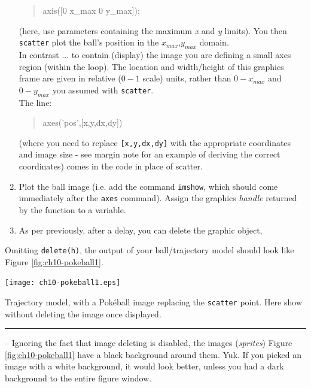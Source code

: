 \documentclass{tufte-book} %
\newenvironment{docspec}{\begin{quotation}\ttfamily\parskip0pt\parindent0pt\ignorespaces}{\end{quotation}}
\begin{document}
\begin{enumerate}[noitemsep]
\begin{docspec}
axis([0 x\_max 0 y\_max]);
\end{docspec}
(here, use parameters containing the maximum \textit{x} and \textit{y} limits). You then \texttt{scatter} plot the ball's position in the \(x_{max}\),\(y_{max}\) domain.
\\In contrast ...  to contain (display) the image you are defining a small axes region (within the loop). The location and width/height of this graphics frame are given in relative (\(0-1\) scale) units, rather than \(0-x_{max}\) and \(0-y_{max}\) you assumed with \texttt{scatter}.
\\The line:
\begin{docspec}
axes('pos',[x,y,dx,dy])
\end{docspec}
(where you need to replace \texttt{[x,y,dx,dy]} with the appropriate coordinates and image size - see margin note for an example of deriving the correct coordinates) comes in the code in place of scatter.  

\vspace{1mm}
\item Plot the ball image (i.e. add the command \texttt{imshow}, which should come immediately after the \texttt{axes} command). Assign the graphics \textit{handle} returned by the function to a variable.

\vspace{1mm}
\item As per previously, after a delay, you can delete the graphic object,

\end{enumerate}

Omitting \texttt{delete(h)}, the output of your ball/trajectory model should look like Figure \ref{fig:ch10-pokeball1}.

\begin{marginfigure}[0.0in]
\texttt{[image: ch10-pokeball1.eps]}
\caption{Trajectory model, with a Pok\'eball image replacing the \texttt{scatter} point. Here show without deleting the image once displayed.}
\label{fig:ch10-pokeball1}
\end{marginfigure}

\vspace{1mm}
\noindent\rule{4cm}{0.5pt}
\vspace{-2mm}

\newthought{\textbf{\textcolor{red}{OPTIONAL}}} -- Ignoring the fact that image deleting is disabled, the images (\textit{sprites}) Figure \ref{fig:ch10-pokeball1} have a black background around them. Yuk. If you picked an image with a white background, it would look better, unless you had a dark background to the entire figure window.
\end{document}
